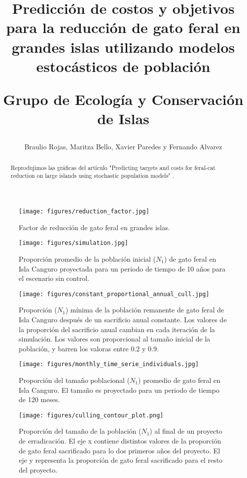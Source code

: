 \documentclass{article} %
\author{Braulio Rojas, Maritza Bello, Xavier Paredes y Fernando Alvarez}
\title{Predicción de costos y objetivos para la reducción de gato feral en grandes islas utilizando
modelos estocásticos de población \\ \begin{large} Grupo de Ecología y Conservación de Islas
\end{large}}
\begin{document}
\maketitle

\begin{abstract}

Reprodujimos las gráficas del artículo "Predicting targets and costs for feral-cat reduction on
large islands using stochastic population models" \cite{venning2021predicting}.

\end{abstract}


\begin{figure}[H]
    \centering
\texttt{[image: figures/reduction\_factor.jpg]}
\caption{Factor de reducción de gato feral en grandes islas.}
\label{fig:reductionFactor}
\end{figure}

\begin{figure}[H]
    \centering
\texttt{[image: figures/simulation.jpg]}
\caption{Proporción promedio de la población inicial ($N_1$) de gato feral en Isla Canguro
proyectada para un periodo de tiempo de 10 años para el escenario sin control.}
\label{fig:simulation}
\end{figure}

\begin{figure}[H]
    \centering
\texttt{[image: figures/constant\_proportional\_annual\_cull.jpg]}
\caption{Proporción ($N_1$) mínima de la población remanente de gato feral de Isla Canguro después
	de un sacrificio anual constante. Los valores de la proporción del sacrificio anual cambian en
	cada iteración de la simulación. Los valores son proporcional al tamaño inicial de la población,
	y barren los valoras entre 0.2 y 0.9.}
\label{fig:constantProportionalAnnualCull}
\end{figure}

\begin{figure}[H]
    \centering
\texttt{[image: figures/monthly\_time\_serie\_individuals.jpg]}
\caption{Proporción del tamaño poblacional ($N_1$) promedio de gato feral en Isla Canguro. El tamaño
es proyectado para un periodo de tiempo de 120 meses.}
\label{fig:monthlyTimeSerieIndividuals}
\end{figure}

\begin{figure}[H]
\centering
\texttt{[image: figures/culling\_contour\_plot.png]}
\caption{Proporción del tamaño de la población ($N_1$) al final de un proyecto de erradicación. El
eje x contiene distintos valores de la proporción de gato feral sacrificado para lo dos primeros
años del proyecto. El eje y representa la proporción de gato feral sacrificado para el resto del
proyecto.}
\label{fig:culling_contour_plot}
\end{figure}
\end{document}
